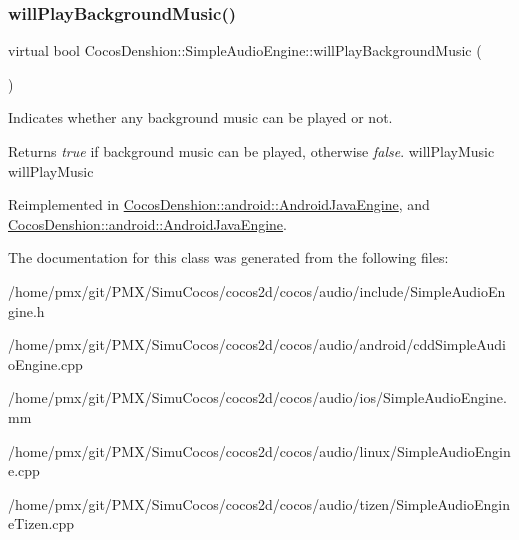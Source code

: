 \subsubsection{\texorpdfstring{will\+Play\+Background\+Music()}{willPlayBackgroundMusic()}\hspace{0.1cm}{\footnotesize\ttfamily [2/2]}}
{\footnotesize\ttfamily virtual bool Cocos\+Denshion\+::\+Simple\+Audio\+Engine\+::will\+Play\+Background\+Music (\begin{DoxyParamCaption}{ }\end{DoxyParamCaption})\hspace{0.3cm}{\ttfamily [virtual]}}

Indicates whether any background music can be played or not.

\begin{DoxyReturn}{Returns}
{\itshape true} if background music can be played, otherwise {\itshape false}.  will\+Play\+Music  will\+Play\+Music 
\end{DoxyReturn}


Reimplemented in \hyperlink{classCocosDenshion_1_1android_1_1AndroidJavaEngine_a3d3d6f0913b802f34598d4a89023a21f}{Cocos\+Denshion\+::android\+::\+Android\+Java\+Engine}, and \hyperlink{classCocosDenshion_1_1android_1_1AndroidJavaEngine_aa6301c0260249ef37088872b3710adeb}{Cocos\+Denshion\+::android\+::\+Android\+Java\+Engine}.



The documentation for this class was generated from the following files\+:\begin{DoxyCompactItemize}
\item 
/home/pmx/git/\+P\+M\+X/\+Simu\+Cocos/cocos2d/cocos/audio/include/Simple\+Audio\+Engine.\+h\item 
/home/pmx/git/\+P\+M\+X/\+Simu\+Cocos/cocos2d/cocos/audio/android/cdd\+Simple\+Audio\+Engine.\+cpp\item 
/home/pmx/git/\+P\+M\+X/\+Simu\+Cocos/cocos2d/cocos/audio/ios/Simple\+Audio\+Engine.\+mm\item 
/home/pmx/git/\+P\+M\+X/\+Simu\+Cocos/cocos2d/cocos/audio/linux/Simple\+Audio\+Engine.\+cpp\item 
/home/pmx/git/\+P\+M\+X/\+Simu\+Cocos/cocos2d/cocos/audio/tizen/Simple\+Audio\+Engine\+Tizen.\+cpp\end{DoxyCompactItemize}
